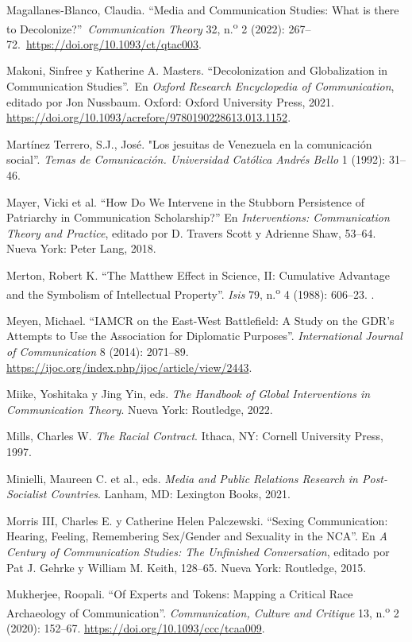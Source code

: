 \documentclass{tufte-handout}
\begin{document}
\begin{hangparas}{.25in}{1}
Magallanes-Blanco, Claudia. ``Media and Communication Studies: What is
there to Decolonize?''~\emph{Communication Theory} 32,
n.\textsuperscript{o} 2 (2022):
267--72.~\url{https://doi.org/10.1093/ct/qtac003}.

Makoni, Sinfree y Katherine A. Masters. ``Decolonization and
Globalization in Communication Studies''.~En \emph{Oxford Research
Encyclopedia of Communication}, editado por Jon Nussbaum. Oxford: Oxford
University Press, 2021.
\url{https://doi.org/10.1093/acrefore/9780190228613.013.1152}.

Martínez Terrero, S.J., José. "Los jesuitas de Venezuela en la
comunicación social''. \emph{Temas de Comunicación. Universidad Católica
Andrés Bello} 1 (1992): 31--46.

Mayer, Vicki et al. ``How Do We Intervene in the Stubborn Persistence of
Patriarchy in Communication Scholarship?'' En \emph{Interventions:
Communication Theory and Practice}, editado por D. Travers Scott y
Adrienne Shaw, 53--64. Nueva York: Peter Lang, 2018.

Merton, Robert K. ``The Matthew Effect in Science, II: Cumulative
Advantage and the Symbolism of Intellectual Property''. \emph{Isis} 79,
n.\textsuperscript{o} 4 (1988): 606--23. .

Meyen, Michael. ``IAMCR on the East-West Battlefield: A Study on the
GDR's Attempts to Use the Association for Diplomatic Purposes''.
\emph{International Journal of Communication} 8 (2014): 2071--89.
\url{https://ijoc.org/index.php/ijoc/article/view/2443}.

Miike, Yoshitaka y Jing Yin, eds. \emph{The Handbook of Global
Interventions in Communication Theory}. Nueva York: Routledge, 2022.

Mills, Charles W. \emph{The Racial Contract}. Ithaca, NY: Cornell
University Press, 1997.

Minielli, Maureen C. et al., eds. \emph{Media and Public Relations
Research in Post-Socialist Countries}. Lanham, MD: Lexington Books,
2021.

Morris III, Charles E. y Catherine Helen Palczewski. ``Sexing
Communication: Hearing, Feeling, Remembering Sex/Gender and Sexuality in
the NCA''. En \emph{A Century of Communication Studies: The Unfinished
Conversation}, editado por Pat J. Gehrke y William M. Keith, 128--65.
Nueva York: Routledge, 2015.

Mukherjee, Roopali. ``Of Experts and Tokens: Mapping a Critical Race
Archaeology of Communication''. \emph{Communication, Culture and
Critique} 13, n.\textsuperscript{o} 2 (2020): 152--67.
\url{https://doi.org/10.1093/ccc/tcaa009}.


\end{hangparas}
\end{document}

